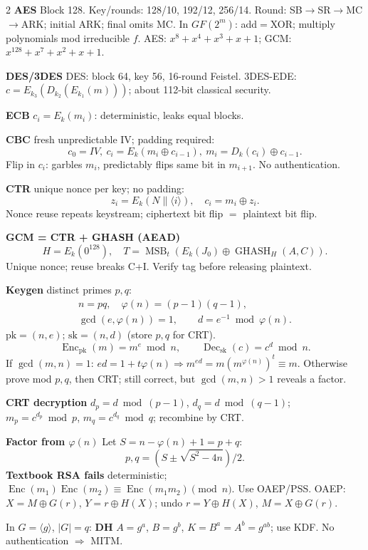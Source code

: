 \documentclass[8pt,a4paper]{extarticle}
\newcommand{\sect}[1]{\vspace{0.8pt}{\bfseries\rule{\linewidth}{0.2pt}\par\vspace{-1.8pt}#1}\par\vspace{-0.2pt}}
\newcommand{\sub}[1]{\vspace{0.2pt}\textbf{#1}\;}
\newcommand{\Enc}{\operatorname{Enc}}
\newcommand{\Dec}{\operatorname{Dec}}
\newcommand{\MSB}{\operatorname{MSB}}
\newcommand{\GHASH}{\operatorname{GHASH}}
\begin{document}
\begin{multicols}{2}
\sub{AES} Block 128. Key/rounds: 128/10, 192/12, 256/14. Round: SB$\to$SR$\to$MC$\to$ARK; initial ARK; final omits MC. In $GF(2^m)$: add$=$XOR; multiply polynomials mod irreducible $f$. AES: $x^8+x^4+x^3+x+1$; GCM: $x^{128}+x^7+x^2+x+1$.

\sub{DES/3DES} DES: block 64, key 56, 16-round Feistel. 3DES-EDE: $c=E_{k_3}(D_{k_2}(E_{k_1}(m)))$; about 112-bit classical security.

\sub{ECB} $c_i=E_k(m_i)$: deterministic, leaks equal blocks.

\sub{CBC} fresh unpredictable IV; padding required:
\[
\boxed{c_0=IV,\ c_i=E_k(m_i\oplus c_{i-1}),\ m_i=D_k(c_i)\oplus c_{i-1}}.
\]
Flip in $c_i$: garbles $m_i$, predictably flips same bit in $m_{i+1}$. No authentication.

\sub{CTR} unique nonce per key; no padding:
\[
\boxed{z_i=E_k(N\|\langle i\rangle),\quad c_i=m_i\oplus z_i}.
\]
Nonce reuse repeats keystream; ciphertext bit flip $=$ plaintext bit flip.

\sub{GCM = CTR + GHASH (AEAD)}
\[
H=E_k(0^{128}),\quad
\boxed{T=\MSB_t(E_k(J_0)\oplus\GHASH_H(A,C))}.
\]
Unique nonce; reuse breaks C+I. Verify tag before releasing plaintext.

\columnbreak
\sect{RSA}
\sub{Keygen} distinct primes $p,q$:
\[
\begin{gathered}
n=pq,\quad \varphi(n)=(p-1)(q-1),\\
\gcd(e,\varphi(n))=1,\qquad
\boxed{d=e^{-1}\bmod\varphi(n)}.
\end{gathered}
\]
$\mathrm{pk}=(n,e)$; $\mathrm{sk}=(n,d)$ (store $p,q$ for CRT).
\[
\boxed{\Enc_{\mathrm{pk}}(m)=m^e\bmod n,\qquad
\Dec_{\mathrm{sk}}(c)=c^d\bmod n}.
\]
If $\gcd(m,n)=1$: $ed=1+t\varphi(n)\Rightarrow m^{ed}=m(m^{\varphi(n)})^t\equiv m$. Otherwise prove mod $p,q$, then CRT; still correct, but $\gcd(m,n)>1$ reveals a factor.

\sub{CRT decryption}
$d_p=d\bmod(p-1)$, $d_q=d\bmod(q-1)$;
$m_p=c^{d_p}\bmod p$, $m_q=c^{d_q}\bmod q$; recombine by CRT.

\sub{Factor from $\varphi(n)$} Let $S=n-\varphi(n)+1=p+q$:
\[
\boxed{p,q=(S\pm\sqrt{S^2-4n})/2}.
\]
\sub{Textbook RSA fails} deterministic; $\Enc(m_1)\Enc(m_2)\equiv\Enc(m_1m_2)\pmod n$. Use OAEP/PSS. OAEP: $X=M\oplus G(r)$, $Y=r\oplus H(X)$; undo $r=Y\oplus H(X)$, $M=X\oplus G(r)$.

\sect{DH / ELGAMAL / HARD PROBLEMS}
In $G=\langle g\rangle$, $|G|=q$:
\sub{DH} $A=g^a$, $B=g^b$,
$\boxed{K=B^a=A^b=g^{ab}}$; use KDF. No authentication $\Rightarrow$ MITM.


\end{multicols}
\end{document}
